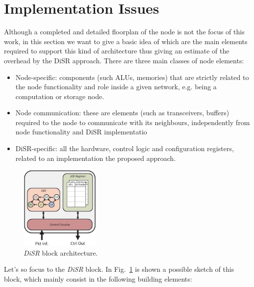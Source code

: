 
\section{Implementation Issues}
\label{sec:implementation}

Although a completed and detailed floorplan of the node is not the
focus of this work, in this section we want to give a basic idea of
which are the main elements required to support this kind of
architecture thus giving an estimate of the overhead by the
DiSR approach. There are three main classes of node elements:
\begin{itemize}
\item Node-specific: components (such ALUs, memories) that are
strictly related to the node functionality and role inside a given
network, e.g. being a computation or storage node.
\item Node communication:  these are elements (such as transceivers,
buffers) required to the node to communicate with its neighbours,
independently from node functionality and DiSR implementatio
\item DiSR-specific: all the hardware, control logic and
configuration registers, related to an implementation the proposed approach.
\end{itemize}

\begin{figure}
  \centering
  \includegraphics[width=0.35\textwidth]{pictures/disr_imp.eps}
  \caption{\emph{DiSR} block architecture.}
 \label{fig:implementation}
\end{figure}

Let's so focus to the \emph{DiSR} block. In
Fig.~\ref{fig:implementation} is shown a possible sketch of this
block, which mainly consist in the following building elements:

